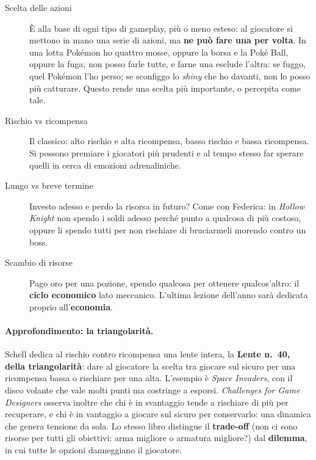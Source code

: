 \begin{description}
  \item[Scelta delle azioni] È alla base di ogni tipo di gameplay, più o
        meno esteso: al giocatore si mettono in mano una serie di azioni, ma
        \textbf{ne può fare una per volta}. In una lotta Pokémon ho quattro
        mosse, oppure la borsa e la Poké Ball, oppure la fuga; non posso
        farle tutte, e farne una esclude l'altra: se fuggo, quel Pokémon
        l'ho perso; se sconfiggo lo \emph{shiny} che ho davanti, non lo posso
        più catturare. Questo rende una scelta più importante, o percepita
        come tale.
  \item[Rischio vs ricompensa] Il classico: alto rischio e alta ricompensa,
        basso rischio e bassa ricompensa. Si possono premiare i giocatori più
        prudenti e al tempo stesso far sperare quelli in cerca di emozioni
        adrenaliniche.
  \item[Lungo vs breve termine] Investo adesso e perdo la risorsa in futuro?
        Come con Federica: in \emph{Hollow Knight} non spendo i soldi adesso
        perché punto a qualcosa di più costoso, oppure li spendo tutti per
        non rischiare di bruciarmeli morendo contro un boss.
  \item[Scambio di risorse] Pago oro per una pozione, spendo qualcosa per
        ottenere qualcos'altro: il \textbf{ciclo economico} lato meccanico.
        L'ultima lezione dell'anno sarà dedicata proprio
        all'\textbf{economia}.
\end{description}

\paragraph{Approfondimento: la triangolarità.} Schell dedica al rischio
contro ricompensa una lente intera, la \textbf{Lente n.~40, della
triangolarità}: dare al giocatore la scelta tra giocare sul sicuro per una
ricompensa bassa o rischiare per una alta. L'esempio è \emph{Space
Invaders}, con il disco volante che vale molti punti ma costringe a esporsi.
\emph{Challenges for Game Designers} osserva inoltre che chi è in svantaggio
tende a rischiare di più per recuperare, e chi è in vantaggio a giocare sul
sicuro per conservarlo: una dinamica che genera tensione da sola. Lo stesso
libro distingue il \textbf{trade-off} (non ci sono risorse per tutti gli
obiettivi: arma migliore o armatura migliore?) dal \textbf{dilemma}, in cui
tutte le opzioni danneggiano il giocatore.

